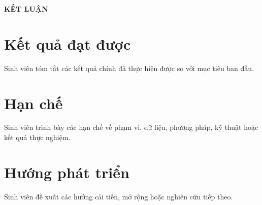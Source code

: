 \begin{center}
\large {\textbf{KẾT LUẬN}}
\end{center}

\section*{Kết quả đạt được}
Sinh viên tóm tắt các kết quả chính đã thực hiện được so với mục tiêu ban đầu.

\section*{Hạn chế}
Sinh viên trình bày các hạn chế về phạm vi, dữ liệu, phương pháp, kỹ thuật hoặc kết quả thực nghiệm.

\section*{Hướng phát triển}
Sinh viên đề xuất các hướng cải tiến, mở rộng hoặc nghiên cứu tiếp theo.


